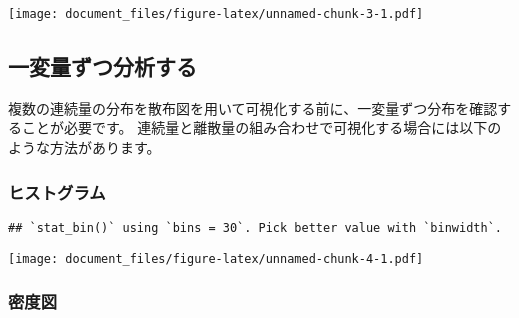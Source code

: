 \documentclass[]{article}
\newenvironment{Shaded}{\begin{snugshade}}{\end{snugshade}}
\newcommand{\DataTypeTok}[1]{\textcolor[rgb]{0.13,0.29,0.53}{#1}}
\newcommand{\DecValTok}[1]{\textcolor[rgb]{0.00,0.00,0.81}{#1}}
\newcommand{\FloatTok}[1]{\textcolor[rgb]{0.00,0.00,0.81}{#1}}
\newcommand{\KeywordTok}[1]{\textcolor[rgb]{0.13,0.29,0.53}{\textbf{#1}}}
\newcommand{\NormalTok}[1]{#1}
\newcommand{\OperatorTok}[1]{\textcolor[rgb]{0.81,0.36,0.00}{\textbf{#1}}}
\newcommand{\StringTok}[1]{\textcolor[rgb]{0.31,0.60,0.02}{#1}}
\begin{document}
\texttt{[image: document\_files/figure-latex/unnamed-chunk-3-1.pdf]}

\subsection{一変量ずつ分析する}

複数の連続量の分布を散布図を用いて可視化する前に、一変量ずつ分布を確認することが必要です。
連続量と離散量の組み合わせで可視化する場合には以下のような方法があります。

\subsubsection{ヒストグラム}

\begin{Shaded}
\end{Shaded}

\begin{verbatim}
## `stat_bin()` using `bins = 30`. Pick better value with `binwidth`.
\end{verbatim}

\texttt{[image: document\_files/figure-latex/unnamed-chunk-4-1.pdf]}

\subsubsection{密度図}

\begin{Shaded}
\end{Shaded}
\end{document}
